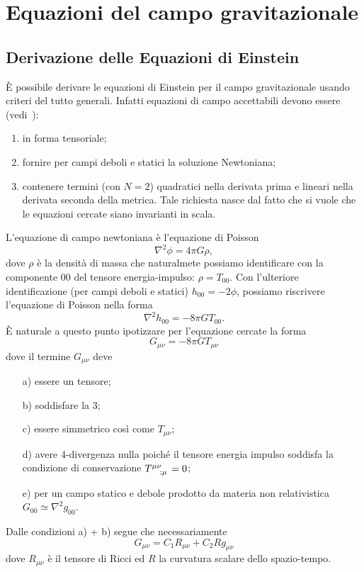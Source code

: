 \cleardoublepage

\chapter{Equazioni del campo gravitazionale}
\label{cha:equazioni-campo-grav}

\section{Derivazione delle Equazioni di Einstein}

È possibile derivare le equazioni di Einstein per il campo gravitazionale usando
criteri del tutto generali.  Infatti equazioni di campo accettabili devono
essere (vedi~\textcite[151]{weinberg:gravitation}):
\begin{enumerate}
\item in forma tensoriale;
\item fornire per campi deboli e statici la soluzione Newtoniana;
\item contenere termini (con $N=2$) quadratici nella derivata prima e lineari
  nella derivata seconda della metrica.  Tale richiesta nasce dal fatto che si
  vuole che le equazioni cercate siano invarianti in scala.
\end{enumerate}
L'equazione di campo newtoniana è l'equazione di Poisson
\begin{equation}
  \nabla^2 \phi = 4 \pi G \rho,
\end{equation}
dove $\rho$ è la densità di massa che naturalmete possiamo identificare con la
componente $00$ del tensore energia-impulso: $\rho = T_{00}$.  Con l'ulteriore
identificazione (per campi deboli e statici) $h_{00} = - 2 \phi$, possiamo
riscrivere l'equazione di Poisson nella forma
\begin{equation}
  \nabla^2 h_{00} = - 8 \pi G T_{00}.
\end{equation}
È naturale a questo punto ipotizzare per l'equazione cercate la forma
\begin{equation}
  G_{\mu \nu} = - 8 \pi G T_{\mu \nu}
\end{equation}
dove il termine $G_{\mu \nu}$ deve
\begin{itemize}
\item[a)] essere un tensore;
\item[b)] soddisfare la 3;
\item[c)] essere simmetrico così come $T_{\mu \nu}$;
\item[d)] avere 4-divergenza nulla poiché il tensore energia impulso soddisfa la
  condizione di conservazione $\tensor{T}{^{\mu \nu}_{; \mu}} =0$;
\item[e)] per un campo statico e debole prodotto da materia non relativistica
  $G_{00} \simeq \nabla^2 g_{00}$.
\end{itemize}
Dalle condizioni a) + b) segue che necessariamente
\begin{equation}
  G_{\mu \nu} = C_1 R_{\mu \nu} + C_2 R g_{\mu \nu}
\end{equation}
dove $R_{\mu \nu}$ è il tensore di Ricci ed $R$ la curvatura scalare dello
spazio-tempo.

